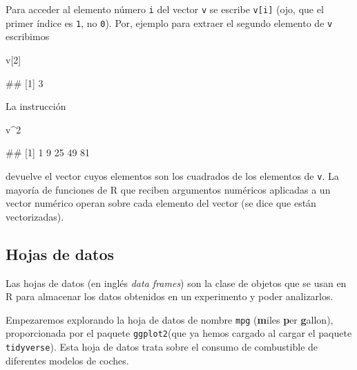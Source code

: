 \documentclass[
  title=normal,
  notoc,
  bib=normal]{mnye}
\newenvironment{Shaded}{\begin{snugshade}}{\end{snugshade}}
\newcommand{\DecValTok}[1]{\textcolor[rgb]{0.00,0.00,0.81}{#1}}
\newcommand{\NormalTok}[1]{#1}
\newcommand{\SpecialCharTok}[1]{\textcolor[rgb]{0.00,0.00,0.00}{#1}}
\begin{document}
Para acceder al elemento número \texttt{i} del vector \texttt{v} se escribe \texttt{v{[}i{]}} (ojo, que el primer índice es \texttt{1}, no \texttt{0}). Por, ejemplo para extraer el segundo elemento de \texttt{v} escribimos

\begin{Shaded}
\begin{Highlighting}[]
\NormalTok{v[}\DecValTok{2}\NormalTok{]}
\end{Highlighting}
\end{Shaded}

\begin{Shaded}
\begin{Highlighting}[]
\NormalTok{\#\# [1] 3}
\end{Highlighting}
\end{Shaded}

La instrucción

\begin{Shaded}
\begin{Highlighting}[]
\NormalTok{v}\SpecialCharTok{\^{}}\DecValTok{2}
\end{Highlighting}
\end{Shaded}

\begin{Shaded}
\begin{Highlighting}[]
\NormalTok{\#\# [1]  1  9 25 49 81}
\end{Highlighting}
\end{Shaded}

devuelve el vector cuyos elementos son los cuadrados de los elementos de \texttt{v}.
La mayoría de funciones de \textsf{R} que reciben argumentos numéricos aplicadas a un vector numérico operan sobre cada elemento del vector (se dice que están vectorizadas).

\hypertarget{hojas-de-datos}{%
\subsection{Hojas de datos}\label{hojas-de-datos}}

Las hojas de datos (en inglés \emph{data frames}) son la clase de objetos que se usan en \textsf{R} para almacenar los datos obtenidos en un experimento y poder analizarlos.

Empezaremos explorando la hoja de datos de nombre \texttt{mpg} (\textbf{m}iles \textbf{p}er \textbf{g}allon), proporcionada por el paquete \texttt{ggplot2}(que ya hemos cargado al cargar el paquete \texttt{tidyverse}). Esta hoja de datos trata sobre el consumo de combustible de diferentes modelos de coches.
\end{document}
